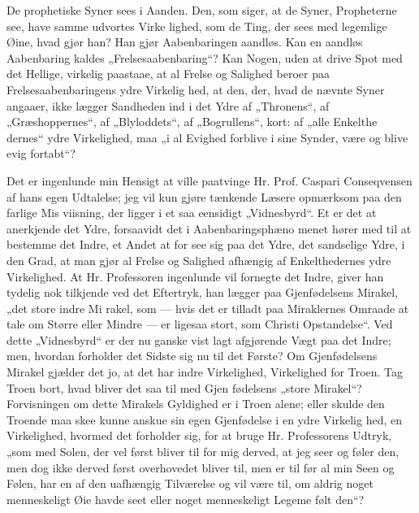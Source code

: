 \documentclass[12pt]{book}
\newcommand{\opage}[1]{\marginnote{\footnotesize\textit{[#1]}}}
\begin{document}
De prophetiske Syner sees i Aanden. Den, som siger,
at de Syner, Propheterne see, have samme udvortes Virke\-%
lighed, som de Ting, der sees med legemlige Øine, hvad gjør
\opage{301}\setcounter{footnote}{0}%
han? Han gjør Aabenbaringen aandløs. Kan en aandløs
Aabenbaring kaldes „Frelsesaabenbaring“? Kan Nogen, uden
at drive Spot med det Hellige, virkelig paastaae, at al Frelse
og Salighed beroer paa Frelsesaabenbaringens ydre Virkelig\-%
hed, at den, der, hvad de nævnte Syner angaaer, ikke lægger
Sandheden ind i det Ydre af „Thronens“, af „Græshoppernes“,
af „Blyloddets“, af „Bogrullens“, kort: af „alle Enkelthe\-%
dernes“ ydre Virkelighed, maa „i al Evighed forblive i sine
Synder, være og blive evig fortabt“?

Det er ingenlunde min Hensigt at ville paatvinge Hr.
Prof. Caspari Conseqvensen af hans egen Udtalelse; jeg vil
kun gjøre tænkende Læsere opmærksom paa den farlige Mis\-%
viisning, der ligger i et saa eensidigt „Vidnesbyrd“. Et er det
at anerkjende det Ydre, forsaavidt det i Aabenbaringsphæno\-%
menet hører med til at bestemme det Indre, et Andet at for\-%
see sig paa det Ydre, det sandselige Ydre, i den Grad, at
man gjør al Frelse og Salighed afhængig af Enkelthedernes
ydre Virkelighed. At Hr. Professoren ingenlunde vil fornegte
det Indre, giver han tydelig nok tilkjende ved det Eftertryk,
han lægger paa Gjenfødelsens Mirakel, „det store indre Mi\-%
rakel, som --- hvis det er tilladt paa Miraklernes Omraade
at tale om Større eller Mindre --- er ligesaa stort, som Christi
Opstandelse“. Ved dette „Vidnesbyrd“ er der nu ganske vist
lagt afgjørende Vægt paa det Indre; men, hvordan forholder
det Sidste sig nu til det Første? Om Gjenfødelsens Mirakel
gjælder det jo, at det har indre Virkelighed, Virkelighed for
Troen. Tag Troen bort, hvad bliver det saa til med Gjen\-%
fødelsens „store Mirakel“? Forvisningen om dette Mirakels
Gyldighed er i Troen alene; eller skulde den Troende maa\-%
skee kunne anskue sin egen Gjenfødelse i en ydre Virkelig\-%
hed, en Virkelighed, hvormed det forholder sig, for at bruge
Hr. Professorens Udtryk, „som med Solen, der vel først bliver
til for mig derved, at jeg seer og føler den, men dog ikke
derved først overhovedet bliver til, men er til før al min Seen
\opage{302}\setcounter{footnote}{0}%
og Følen, har en af den uafhængig Tilværelse og vil være
til, om aldrig noget menneskeligt Øie havde seet eller noget
menneskeligt Legeme følt den“?
\end{document}
